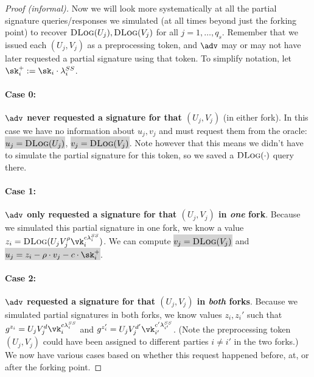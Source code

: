 \begin{proof}[Proof (informal)]
Now we will look more systematically at all the partial signature queries/{\allowbreak}responses we simulated (at all times beyond just the forking point) to recover $\textsc{DLog}(U_j),\allowbreak \textsc{DLog}(V_j)$ for all $j = 1, \dots, q_s$. Remember that we issued each $(U_j, V_j)$ as a preprocessing token, and $\adv$ may or may not have later requested a partial signature using that token. To simplify notation, let $\sk_i^+ := \sk_i \cdot \lambda_i^{SS}$.

\paragraph{Case 0:} \textbf{$\adv$ never requested a signature for that $(U_j, V_j)$} (in either fork).
In this case we have no information about $u_j, v_j$ and must request them from the oracle: \colorbox{lightgray}{$u_j = \textsc{DLog}(U_j)$}, \colorbox{lightgray}{$v_j = \textsc{DLog}(V_j)$}. Note however that this means we didn't have to simulate the partial signature for this token, so we saved a $\textsc{DLog}(\cdot)$ query there.

\paragraph{Case 1:} \textbf{$\adv$ only requested a signature for that $(U_j, V_j)$ in \emph{one} fork}.
Because we simulated this partial signature in one fork, we know a value $z_i = \textsc{DLog}(U_j V_j^\rho \vk_i^{c \lambda_i^{SS}})$. We can compute \colorbox{lightgray}{$v_j = \textsc{DLog}(V_j)$} and \colorbox{lightgray}{$u_j = z_i - \rho \cdot v_j - c \cdot \sk_i^+$}.

\paragraph{Case 2:} \textbf{$\adv$ requested a signature for that $(U_j, V_j)$ in \emph{both} forks}.
Because we simulated partial signatures in both forks, we know values $z_i, z_i'$ such that $g^{z_i} = U_j V_j^d \vk_i^{c \lambda_i^{SS}}$ and $g^{z_i'} = U_j V_j^{d'} \vk_{i'}^{c' \lambda_{i'}^{SS}}$. (Note the preprocessing token $(U_j, V_j)$ could have been assigned to different parties $i \neq i'$ in the two forks.)
We now have various cases based on whether this request happened before, at, or after the forking point.


\end{proof}
